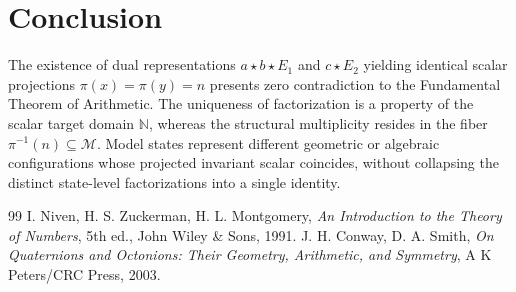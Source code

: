 \documentclass[11pt,a4paper,reqno]{amsart}
\theoremstyle{definition}
\theoremstyle{remark}
\newcommand{\M}{\mathcal{M}}
\newcommand{\N}{\mathbb{N}}
\begin{document}
	\section{Conclusion}
	
	The existence of dual representations $a \star b \star E_1$ and $c \star E_2$ yielding identical scalar projections $\pi(x) = \pi(y) = n$ presents zero contradiction to the Fundamental Theorem of Arithmetic. The uniqueness of factorization is a property of the scalar target domain $\N$, whereas the structural multiplicity resides in the fiber $\pi^{-1}(n) \subseteq \M$. Model states represent different geometric or algebraic configurations whose projected invariant scalar coincides, without collapsing the distinct state-level factorizations into a single identity.
	
	\begin{thebibliography}{99}
		 I. Niven, H. S. Zuckerman, H. L. Montgomery, \emph{An Introduction to the Theory of Numbers}, 5th ed., John Wiley \& Sons, 1991.
		 J. H. Conway, D. A. Smith, \emph{On Quaternions and Octonions: Their Geometry, Arithmetic, and Symmetry}, A K Peters/CRC Press, 2003.
	\end{thebibliography}
	
\end{document}
